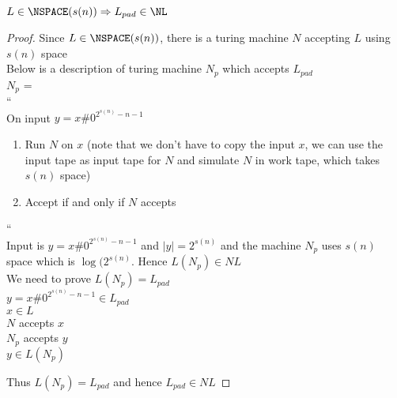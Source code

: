 \begin{claim}\label{q4:L_to_L_pad}
    $L \in \NSPACE(s(n)) \Rightarrow L_{pad} \in \NL$
\end{claim}
\begin{proof}
    Since $L \in \NSPACE(s(n))$, there is a turing machine $N$ accepting $L$ using $s(n)$ space\\
    Below is a description of turing machine $N_p$ which accepts $L_{pad}$\\
    $N_p$ = \\
    ``\\
    On input $y = x\#0^{2^{s(n)} - n - 1}$
    \begin{enumerate}
        \item Run $N$ on $x$ (note that we don't have to copy the input $x$, we can use the input tape as input tape for $N$ and simulate $N$ in work tape, which takes $s(n)$ space)
        \item Accept if and only if $N$ accepts
    \end{enumerate}
    ``\\
    Input is $y = x\#0^{2^{s(n)} - n - 1}$ and $|y| = 2^{s(n)}$ and the machine $N_p$ uses $s(n)$ space which is $\log (2^{s(n)}$. Hence $L(N_p) \in NL$\\
    We need to prove $L(N_p) = L_{pad}$\\
    $y = x\#0^{2^{s(n)} - n - 1}\in L_{pad}$\\
    \dimp $x \in L$\\
    \dimp $N$ accepts $x$\\
    \dimp $N_p$ accepts $y$\\
    \dimp $y \in L(N_p)$

    Thus $L(N_p) = L_{pad}$ and hence $L_{pad} \in NL$
\end{proof}

